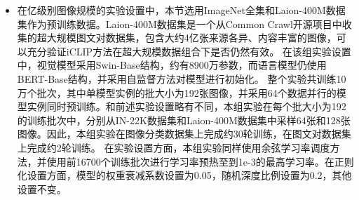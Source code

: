 \begin{itemize}
    \item 在亿级别图像规模的实验设置中，本节选用ImageNet全集和Laion-400M数据集\cite{schuhmann2021laion400m}作为预训练数据。Laion-400M数据集是一个从Common Crawl开源项目中收集的超大规模图文对数据集，包含大约4亿张来源各异、内容丰富的图像，可以充分验证iCLIP方法在超大规模数据组合下是否仍然有效。
    在该组实验设置中，视觉模型采用Swin-Base\cite{Swin}结构，约有8900万参数，而语言模型仍使用BERT-Base结构，并采用自监督方法对模型进行初始化。
    整个实验共训练10万个批次，其中单模型实例的批大小为192张图像，并采用64个数据并行的模型实例同时预训练。和前述实验设置略有不同，本组实验在每个批大小为192的训练批次中，分别从IN-22K数据集和Laion-400M数据集中采样64张和128张图像。因此，本组实验在图像分类数据集上完成约30轮训练，在图文对数据集上完成约2轮训练。
    在实验设置方面，本组实验同样使用余弦学习率调度方法，并使用前16700个训练批次进行学习率预热至到1e-3的最高学习率。在正则化设置方面，模型的权重衰减系数设置为0.05，随机深度比例设置为0.2，其他设置不变。
\end{itemize}

